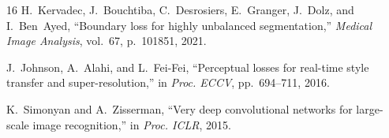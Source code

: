 \documentclass[conference]{IEEEtran}
\begin{document}
\begin{thebibliography}{16}
H.~Kervadec, J.~Bouchtiba, C.~Desrosiers, E.~Granger, J.~Dolz, and I.~Ben~Ayed,
``Boundary loss for highly unbalanced segmentation,''
\textit{Medical Image Analysis}, vol.~67, p.~101851, 2021.

J.~Johnson, A.~Alahi, and L.~Fei-Fei,
``Perceptual losses for real-time style transfer and super-resolution,''
in \textit{Proc. ECCV}, pp.~694--711, 2016.

K.~Simonyan and A.~Zisserman,
``Very deep convolutional networks for large-scale image recognition,''
in \textit{Proc. ICLR}, 2015.

\end{thebibliography}
\end{document}
